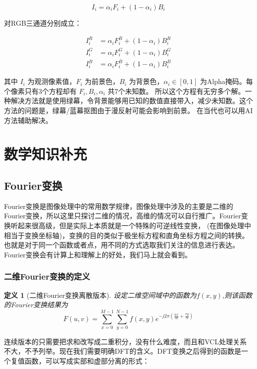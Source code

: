 \documentclass{ctexart}
\theoremstyle{cnthm}
\newtheorem{definition}[theorem]{定义}
\begin{document}
\[
I_i = \alpha_i F_i + (1 - \alpha_i) B_i
\]

对RGB三通道分别成立：

\[
\begin{aligned}
I_i^{R} &= \alpha_i F_i^{R} + (1 - \alpha_i) B_i^{R} \\
I_i^{G} &= \alpha_i F_i^{G} + (1 - \alpha_i) B_i^{G} \\
I_i^{B} &= \alpha_i F_i^{B} + (1 - \alpha_i) B_i^{B}
\end{aligned}
\]

其中 $I_i$ 为观测像素值，$F_i$ 为前景色，$B_i$ 为背景色，$\alpha_i \in [0,1]$ 为Alpha掩码。每个像素只有3个方程却有 $F_i, B_i, \alpha_i$ 共7个未知数。
所以这个方程有无穷多个解。一种解决方法就是使用绿幕，令背景能够用已知的数值直接带入，减少未知数。这个方法的问题是，绿幕/蓝幕抠图由于漫反射可能会影响到前景。
在当代也可以用AI方法辅助解决。

\appendix

\section{数学知识补充}

\subsection{Fourier变换}

Fourier变换是图像处理中的常用数学规律，图像处理中涉及的主要是二维的Fourier变换，所以这里只探讨二维的情况，高维的情况可以自行推广。Fourier变换听起来很高级，但是实际上本质就是一个特殊的可逆线性变换，
(在图像处理中相当于变换坐标轴)，变换的目的类似于极坐标方程和直角坐标方程之间的转换。也就是对于同一个函数或者点，用不同的方式选取我们关注的信息进行表达。Fourier变换会有计算上和理解上的好处，我们马上就会看到。
\subsubsection{二维Fourier变换的定义}

\begin{definition}[二维Fourier变换离散版本]
    设定二维空间域中的函数为$f(x,y)$,则该函数的Fourier变换结果为
    \[
    F(u,v) = \sum_{x = 0}^{M - 1} \sum_{y = 0}^{N - 1} f(x,y) e^{-j2\pi\left(\frac{ux}{M} + \frac{vy}{N}\right)}
    \]
\end{definition}

连续版本的只需要把求和改写成二重积分，没有什么难度，而且和VCL处理关系不大，不予列举。现在我们需要明确DFT的含义。DFT变换之后得到的函数是一个复值函数，可以写成实部和虚部分离的形式：
\end{document}

